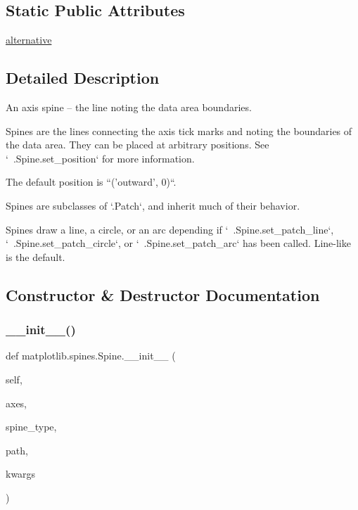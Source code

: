 \subsection*{Static Public Attributes}
\begin{DoxyCompactItemize}
\item 
\hyperlink{classmatplotlib_1_1spines_1_1Spine_aa54fa12606a8f1ac3befab8a516d6868}{alternative}
\end{DoxyCompactItemize}


\subsection{Detailed Description}
\begin{DoxyVerb}An axis spine -- the line noting the data area boundaries.

Spines are the lines connecting the axis tick marks and noting the
boundaries of the data area. They can be placed at arbitrary
positions. See `~.Spine.set_position` for more information.

The default position is ``('outward', 0)``.

Spines are subclasses of `.Patch`, and inherit much of their behavior.

Spines draw a line, a circle, or an arc depending if
`~.Spine.set_patch_line`, `~.Spine.set_patch_circle`, or
`~.Spine.set_patch_arc` has been called. Line-like is the default.\end{DoxyVerb}
 

\subsection{Constructor \& Destructor Documentation}
\mbox{\label{classmatplotlib_1_1spines_1_1Spine_a28cc2ac541537c952dd996d118f8ec43}} 
\subsubsection{\texorpdfstring{\+\_\+\+\_\+init\+\_\+\+\_\+()}{\_\_init\_\_()}}
{\footnotesize\ttfamily def matplotlib.\+spines.\+Spine.\+\_\+\+\_\+init\+\_\+\+\_\+ (\begin{DoxyParamCaption}\item[{}]{self,  }\item[{}]{axes,  }\item[{}]{spine\+\_\+type,  }\item[{}]{path,  }\item[{}]{kwargs }\end{DoxyParamCaption})}

